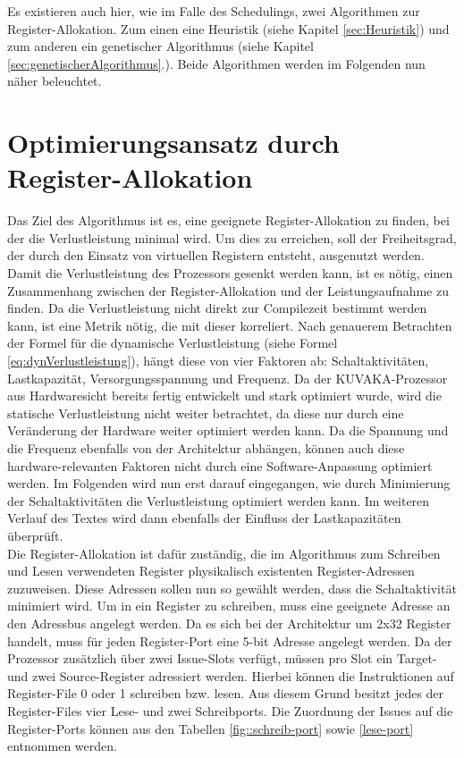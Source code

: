 \begin{itemize}
		Es existieren auch hier, wie im Falle des Schedulings, zwei Algorithmen zur Register-Allokation. Zum einen eine Heuristik (siehe Kapitel \ref{sec:Heuristik}) und zum anderen ein genetischer Algorithmus (siehe Kapitel \ref{sec:genetischerAlgorithmus}.). Beide Algorithmen werden im Folgenden nun näher beleuchtet.
\end{itemize}


\section{Optimierungsansatz durch Register-Allokation}
\label{chap:ansatz}
Das Ziel des Algorithmus ist es, eine geeignete Register-Allokation zu finden, bei der die Verlustleistung minimal wird. Um dies zu erreichen, soll der Freiheitsgrad, der durch den Einsatz von virtuellen Registern entsteht, ausgenutzt werden.
Damit die Verlustleistung des Prozessors gesenkt werden kann, ist es nötig, einen Zusammenhang zwischen der Register-Allokation und der Leistungsaufnahme zu finden. Da die Verlustleistung nicht direkt zur Compilezeit bestimmt werden kann, ist eine Metrik nötig, die mit dieser korreliert.
Nach genauerem Betrachten der Formel für die dynamische Verlustleistung (siehe Formel \ref{eq:dynVerlustleistung}), hängt diese von vier Faktoren ab: Schaltaktivitäten,  Lastkapazität, Versorgungsspannung und Frequenz. Da der KUVAKA-Prozessor aus Hardwaresicht bereits fertig entwickelt und stark optimiert wurde, wird die statische Verlustleistung nicht weiter betrachtet, da diese  nur durch eine Veränderung der Hardware weiter optimiert werden kann. Da die Spannung und die Frequenz ebenfalls von der Architektur abhängen, können auch diese hardware-relevanten Faktoren nicht durch eine Software-Anpassung optimiert werden. Im Folgenden wird nun erst darauf eingegangen, wie durch Minimierung der Schaltaktivitäten die Verlustleistung optimiert werden kann. Im weiteren Verlauf des Textes wird dann ebenfalls der Einfluss der Lastkapazitäten überprüft.\\
Die Register-Allokation ist dafür zuständig, die im Algorithmus zum Schreiben und Lesen verwendeten Register physikalisch existenten Register-Adressen zuzuweisen. Diese Adressen sollen nun so gewählt werden, dass die Schaltaktivität minimiert wird.
Um in ein Register zu schreiben, muss eine geeignete Adresse an den Adressbus angelegt werden. Da es sich bei der Architektur um 2x32 Register handelt, muss für jeden Register-Port eine 5-bit Adresse angelegt werden.
Da der Prozessor zusätzlich über zwei Issue-Slots verfügt, müssen pro Slot ein Target- und zwei Source-Register adressiert werden. Hierbei können die Instruktionen auf Register-File 0 oder 1 schreiben bzw. lesen. Aus diesem Grund besitzt jedes der Register-Files vier Lese- und zwei Schreibports. Die Zuordnung der Issues auf die Register-Ports können aus den Tabellen \ref{fig::schreib-port} sowie \ref{lese-port} entnommen werden.\\
